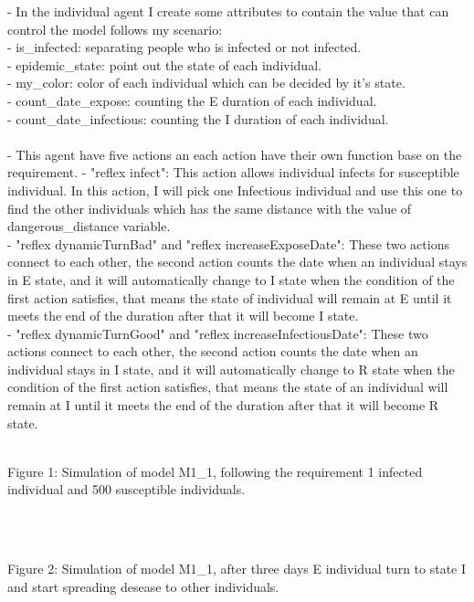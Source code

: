 \documentclass{article}
\begin{document}
- In the individual agent I create some attributes to contain the value that can control the model follows my scenario:
\\
- is\_infected: separating people who is infected or not infected.
\\
- epidemic\_state: point out the state of each individual.
\\
-	my\_color: color of each individual which can be decided by it's state.
\\
-	count\_date\_expose: counting the E duration of each individual.
\\
- count\_date\_infectious: counting the I duration of each individual.
\\\\
- This agent have five actions an each action have their own function base on the requirement.
- "reflex infect": This action allows individual infects for susceptible individual. In this action, I will pick one Infectious individual and use this one to find the other individuals which has the same distance with the value of dangerous\_distance variable.
\\
- "reflex dynamicTurnBad" and "reflex increaseExposeDate": These two actions connect to each other, the second action counts the date when an individual stays in E state, and it will automatically change to I state when the condition of the first action satisfies, that means the state of individual will remain at E until it meets the end of the duration after that it will become I state.
\\
- "reflex dynamicTurnGood" and "reflex increaseInfectiousDate": These two actions connect to each other, the second action counts the date when an individual stays in I state, and it will automatically change to R state when the condition of the first action satisfies, that means the state of an individual will remain at I until it meets the end of the duration after that it will become R state.
\\
\begin{pic1}
\\
\caption{Figure 1: Simulation of model M1\_1, following the requirement 1 infected individual and 500 susceptible individuals.}
\end{pic1}
\\
\begin{pic2}
\\
\caption{Figure 2: Simulation of model M1\_1, after three days E individual turn to state I and start spreading desease to other individuals.}
\end{pic2}
\end{document}
